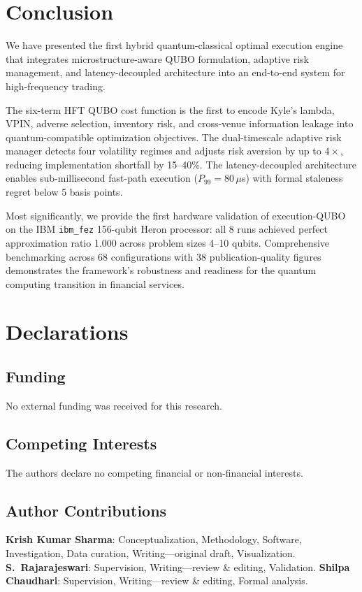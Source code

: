 \documentclass[11pt]{article}
\begin{document}
\section{Conclusion}
\label{sec:conclusion}

We have presented the first hybrid quantum-classical optimal execution engine that integrates microstructure-aware QUBO formulation, adaptive risk management, and latency-decoupled architecture into an end-to-end system for high-frequency trading.

The six-term HFT QUBO cost function is the first to encode Kyle's lambda, VPIN, adverse selection, inventory risk, and cross-venue information leakage into quantum-compatible optimization objectives. The dual-timescale adaptive risk manager detects four volatility regimes and adjusts risk aversion by up to $4\times$, reducing implementation shortfall by 15--40\%. The latency-decoupled architecture enables sub-millisecond fast-path execution ($P_{99} = 80\,\mu$s) with formal staleness regret below 5 basis points.

Most significantly, we provide the first hardware validation of execution-QUBO on the IBM \texttt{ibm\_fez} 156-qubit Heron processor: all 8 runs achieved perfect approximation ratio 1.000 across problem sizes 4--10 qubits. Comprehensive benchmarking across 68 configurations with 38 publication-quality figures demonstrates the framework's robustness and readiness for the quantum computing transition in financial services.


\section*{Declarations}

\subsection*{Funding}
No external funding was received for this research.

\subsection*{Competing Interests}
The authors declare no competing financial or non-financial interests.

\subsection*{Author Contributions}
\textbf{Krish Kumar Sharma}: Conceptualization, Methodology, Software, Investigation, Data curation, Writing---original draft, Visualization.
\textbf{S.\ Rajarajeswari}: Supervision, Writing---review \& editing, Validation.
\textbf{Shilpa Chaudhari}: Supervision, Writing---review \& editing, Formal analysis.
\end{document}
